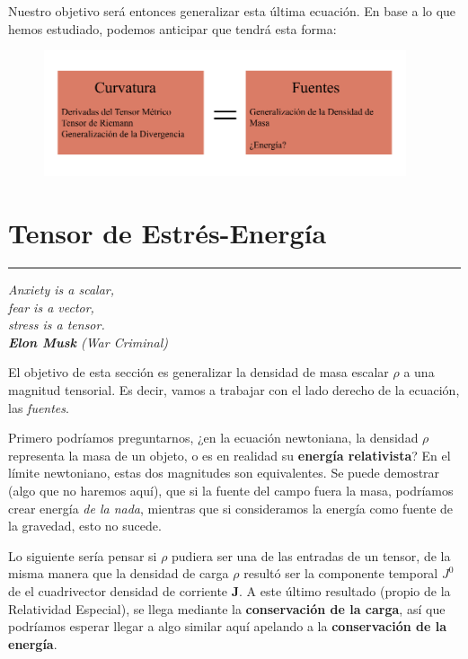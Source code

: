 Nuestro objetivo será entonces generalizar esta última ecuación. En base a lo que hemos estudiado, podemos anticipar que tendrá esta forma:

\begin{figure}[h!]
    \centering
    \includegraphics[width=0.95\textwidth]{Im/eceinstein.png}
    \label{fig:sen}
\end{figure}

\newpage
\section{\huge{Tensor de Estrés-Energía}}
\textcolor{myred}{\hrule}
\begin{flushright}
\textit{Anxiety is a scalar,\\fear is a vector,\\stress is a tensor.\\\textbf{Elon Musk} (War Criminal)}
\end{flushright}
El objetivo de esta sección es generalizar la densidad de masa escalar $\rho$ a una magnitud tensorial. Es decir, vamos a trabajar con el lado derecho de la ecuación, las \textit{fuentes}.

\vspace{0.5cm}

Primero podríamos preguntarnos, ¿en la ecuación newtoniana, la densidad $\rho$ representa la masa de un objeto, o es en realidad su \textbf{energía relativista}? En el límite newtoniano, estas dos magnitudes son equivalentes. Se puede demostrar (algo que no haremos aquí), que si la fuente del campo fuera la masa, podríamos crear energía \textit{de la nada}, mientras que 
si consideramos la energía como fuente de la gravedad, esto no sucede.

\vspace{0.25cm}

Lo siguiente sería pensar si $\rho$ pudiera ser una de las entradas de un tensor, de la misma manera que la densidad de carga $\rho$ resultó ser la componente temporal $J^{0}$ de el cuadrivector densidad de corriente $\mathbf{J}$. A este último resultado (propio de la Relatividad Especial), se llega mediante la \textbf{conservación de la carga}, así que podríamos esperar llegar a algo similar aquí apelando a la \textbf{conservación de la energía}.

